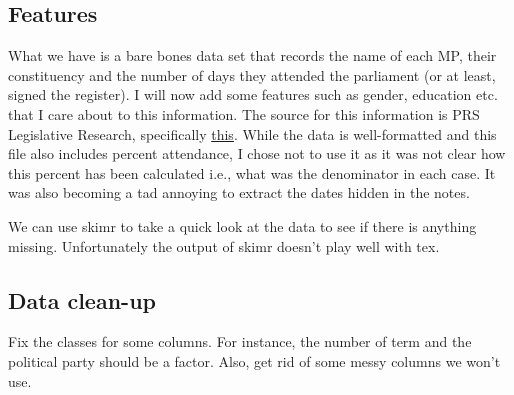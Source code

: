 \documentclass[11pt,]{article}
\newenvironment{Shaded}{\begin{snugshade}}{\end{snugshade}}
\newcommand{\KeywordTok}[1]{\textcolor[rgb]{0.13,0.29,0.53}{\textbf{#1}}}
\newcommand{\StringTok}[1]{\textcolor[rgb]{0.31,0.60,0.02}{#1}}
\newcommand{\OperatorTok}[1]{\textcolor[rgb]{0.81,0.36,0.00}{\textbf{#1}}}
\newcommand{\NormalTok}[1]{#1}
\begin{document}
\subsection{Features}\label{features}

What we have is a bare bones data set that records the name of each MP,
their constituency and the number of days they attended the parliament
(or at least, signed the register). I will now add some features such as
gender, education etc. that I care about to this information. The source
for this information is PRS Legislative Research, specifically
\href{http://www.prsindia.org/mptrack/16loksabha/}{this}. While the data
is well-formatted and this file also includes percent attendance, I
chose not to use it as it was not clear how this percent has been
calculated i.e., what was the denominator in each case. It was also
becoming a tad annoying to extract the dates hidden in the notes.

\begin{Shaded}
\end{Shaded}

We can use skimr to take a quick look at the data to see if there is
anything missing. Unfortunately the output of skimr doesn't play well
with tex.

\subsection{Data clean-up}\label{data-clean-up}

Fix the classes for some columns. For instance, the number of term and
the political party should be a factor. Also, get rid of some messy
columns we won't use.
\end{document}
